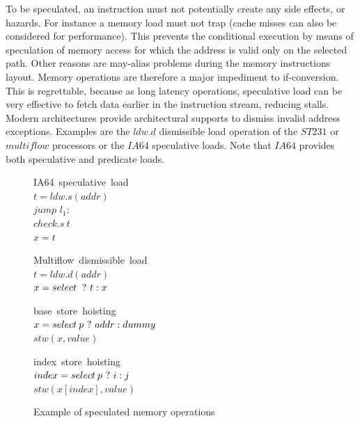 To be speculated, an instruction must not potentially create any side effects, or hazards. For instance a memory load must not trap (cache misses can also be considered for performance). This prevents the conditional execution by means of speculation of memory access for which the address is valid only on the selected path. Other reasons are may-alias problems during the memory instructions layout. Memory operations are therefore a major impediment to if-conversion. This is regrettable, because as long latency operations, speculative load can be very effective to fetch data earlier in the instruction stream, reducing stalls. Modern architectures provide architectural supports to dismiss invalid address exceptions. Examples are the $ldw.d$ dismissible load operation of the $ST231$ or $multiflow$ processors or the $IA64$ speculative loads. Note that $IA64$ provides both speculative and predicate loads.

\begin{figure}
\begin{minipage}[t]{4cm}
\mbox{IA64 speculative load} \\
$t = ldw.s(addr) $ \\
$jump$ $l_1:$ \\
$check.s\:t$ \\
$x = t$ \\
\end{minipage}
\begin{minipage}[t]{4cm}
\mbox{Multiflow dismissible load} \\
$t = ldw.d(addr) $ \\
$x = select\: ~?~ t : x $ \\
\end{minipage}

\begin{minipage}[t]{4cm}
\mbox{base store hoisting} \\
$x=select\:p ~?~ addr : dummy $ \\
$stw (x, value) $ \\
\end{minipage}
\begin{minipage}[t]{4cm}
\mbox{index store hoisting} \\
$index=select\:p ~?~ i : j $ \\
$stw (x[index], value) $ \\
\end{minipage}
\label{fig:spec}
\caption{Example of speculated memory operations}
\end{figure}

